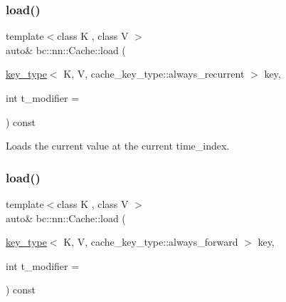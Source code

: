 \subsubsection{\texorpdfstring{load()}{load()}\hspace{0.1cm}{\footnotesize\ttfamily [4/8]}}
{\footnotesize\ttfamily template$<$class K , class V $>$ \\
auto\& bc\+::nn\+::\+Cache\+::load (\begin{DoxyParamCaption}\item[{\hyperlink{structbc_1_1nn_1_1Cache_aedd77c5710dcb5f9edd8ecb3c3041048}{key\+\_\+type}$<$ K, V, cache\+\_\+key\+\_\+type\+::always\+\_\+recurrent $>$}]{key,  }\item[{int}]{t\+\_\+modifier = {} }\end{DoxyParamCaption}) const\hspace{0.3cm}{\ttfamily [inline]}}



Loads the current value at the current time\+\_\+index. 

\mbox{\label{structbc_1_1nn_1_1Cache_a0147ffcacb937b2477aff74a40f8884c}} 
\subsubsection{\texorpdfstring{load()}{load()}\hspace{0.1cm}{\footnotesize\ttfamily [5/8]}}
{\footnotesize\ttfamily template$<$class K , class V $>$ \\
auto\& bc\+::nn\+::\+Cache\+::load (\begin{DoxyParamCaption}\item[{\hyperlink{structbc_1_1nn_1_1Cache_aedd77c5710dcb5f9edd8ecb3c3041048}{key\+\_\+type}$<$ K, V, cache\+\_\+key\+\_\+type\+::always\+\_\+forward $>$}]{key,  }\item[{int}]{t\+\_\+modifier = {} }\end{DoxyParamCaption}) const\hspace{0.3cm}{\ttfamily [inline]}}

\mbox{\label{structbc_1_1nn_1_1Cache_ae0d930bedea24e5afc933c2ddb361770}} 
